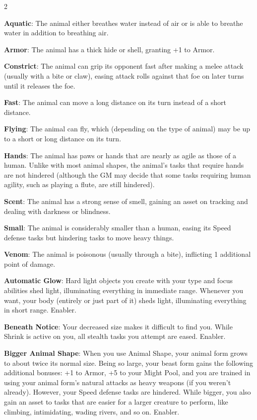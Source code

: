 \begin{multicols}{2}

\textbf{Aquatic}: The animal either breathes water instead of air or is able to breathe water in addition to breathing air.

\textbf{Armor}: The animal has a thick hide or shell, granting +1 to Armor.

\textbf{Constrict}: The animal can grip its opponent fast after making a melee attack (usually with a bite or claw), easing attack rolls against that foe on later turns until it releases the foe.

\textbf{Fast}: The animal can move a long distance on its turn instead of a short distance.

\textbf{Flying}: The animal can fly, which (depending on the type of animal) may be up to a short or long distance on its turn.

\textbf{Hands}: The animal has paws or hands that are nearly as agile as those of a human. Unlike with most animal shapes, the animal’s tasks that require hands are not hindered (although the GM may decide that some tasks requiring human agility, such as playing a flute, are still hindered).

\textbf{Scent}: The animal has a strong sense of smell, gaining an asset on tracking and dealing with darkness or blindness.

\textbf{Small}: The animal is considerably smaller than a human, easing its Speed defense tasks but hindering tasks to move heavy things.

\textbf{Venom}: The animal is poisonous (usually through a bite), inflicting 1 additional point of damage.

\textbf{Automatic Glow}: Hard light objects you create with your type and focus abilities shed light, illuminating everything in immediate range. Whenever you want, your body (entirely or just part of it) sheds light, illuminating everything in short range. Enabler.

\textbf{Beneath Notice}: Your decreased size makes it difficult to find you. While Shrink is active on you, all stealth tasks you attempt are eased. Enabler.

\textbf{Bigger Animal Shape}: When you use Animal Shape, your animal form grows to about twice its normal size. Being so large, your beast form gains the following additional bonuses: +1 to Armor, +5 to your Might Pool, and you are trained in using your animal form’s natural attacks as heavy weapons (if you weren’t already). However, your Speed defense tasks are hindered. While bigger, you also gain
an asset to tasks that are easier for a larger creature to perform, like climbing, intimidating, wading rivers, and so on. Enabler.


\end{multicols}

